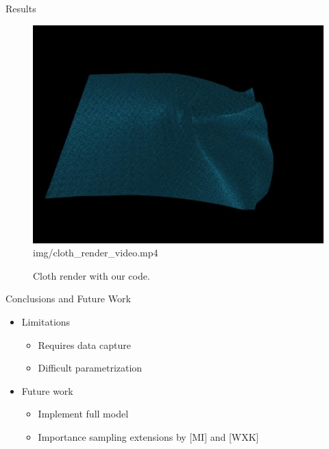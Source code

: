 \documentclass{beamer}
\begin{document}
\begin{frame}{Results}
\begin{figure}[!htb]
\begin{minipage}{.5\textwidth}
        {\includegraphics[width=\textwidth]{img/cloth_render}}{img/cloth_render_video.mp4}
        \caption*{Cloth render with our code.}
    \end{minipage}%
\end{figure}
\end{frame}

\begin{frame}{Conclusions and Future Work}

\begin{itemize}
\setlength\itemsep{0.5em}
\item Limitations
	\begin{itemize}
	\setlength\itemsep{0.5em}
	\item Requires data capture
	\item Difficult parametrization
	\end{itemize}
\item Future work
	\begin{itemize}
	\setlength\itemsep{0.5em}
	\item Implement full model
	\item Importance sampling extensions by [MI] and [WXK]
	\end{itemize}
\end{itemize}

\end{frame}

\section*{}
\end{document}
